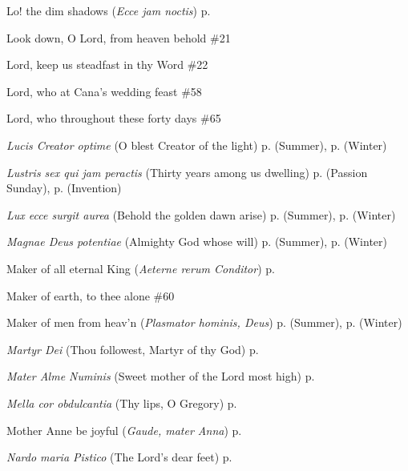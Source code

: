 \begin{hangparas}{1.25em}{1}
\par\noindent
Lo! the dim shadows (\textit{Ecce jam noctis}) \dotfill p. \pageref{SundayMattinsSummer}
\par\noindent
Look down, O Lord, from heaven behold \dotfill \#21
\par\noindent
Lord, keep us steadfast in thy Word \dotfill \#22
\par\noindent
Lord, who at Cana's wedding feast \dotfill \#58
\par\noindent
Lord, who throughout these forty days \dotfill \#65
\par\noindent
\textit{Lucis Creator optime} (O blest Creator of the light) \dotfill p. \pageref{SundayEvensongSummer} (Summer), p. \pageref{SundayEvensongWinter} (Winter)
\par\noindent
\textit{Lustris sex qui jam peractis} (Thirty years among us dwelling) \dotfill p. \pageref{PassionSundayMattins} (Passion Sunday), p. \pageref{InventionMattins} (Invention)
\par\noindent
\textit{Lux ecce surgit aurea} (Behold the golden dawn arise) \dotfill p. \pageref{ThursdayMattinsSummer} (Summer), p. \pageref{ThursdayMattinsWinter} (Winter)
\par\noindent
\textit{Magnae Deus potentiae} (Almighty God whose will) \dotfill p. \pageref{ThursdayEvensongSummer} (Summer), p. \pageref{ThursdayEvensongWinter} (Winter)
\par\noindent
Maker of all eternal King (\textit{Aeterne rerum Conditor}) \dotfill p. \pageref{SundayMattinsWinter}
\par\noindent
Maker of earth, to thee alone \dotfill \#60
\par\noindent
Maker of men from heav'n (\textit{Plasmator hominis, Deus}) \dotfill p. \pageref{FridayEvensongSummer} (Summer), p. \pageref{FridayEvensongWinter} (Winter)
\par\noindent
\textit{Martyr Dei} (Thou followest, Martyr of thy God) \dotfill p. \pageref{StephenMattins}
\par\noindent
\textit{Mater Alme Numinis} (Sweet mother of the Lord most high) \dotfill p. \pageref{MotherhoodMattins}
\par\noindent
\textit{Mella cor obdulcantia} (Thy lips, O Gregory) \dotfill p. \pageref{GregoryMattins}
\par\noindent
Mother Anne be joyful (\textit{Gaude, mater Anna}) \dotfill p. \pageref{AnneEvensong}
\par\noindent
\textit{Nardo maria Pistico} (The Lord's dear feet) \dotfill p. \pageref{MaryMagdaleneInvitatory}

\end{hangparas}
